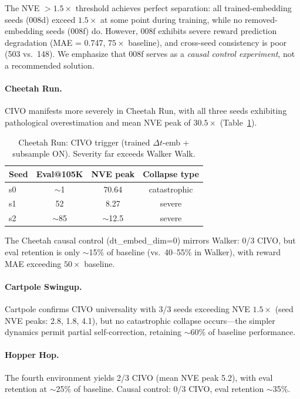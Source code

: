 \documentclass[10pt,letterpaper]{article}
\newcommand{\dt}{\Delta t}
\begin{document}
The NVE $> 1.5\times$ threshold achieves perfect separation: all trained-embedding seeds (008d) exceed $1.5\times$ at some point during training, while no removed-embedding seeds (008f) do. However, 008f exhibits severe reward prediction degradation (MAE = 0.747, $75\times$ baseline), and cross-seed consistency is poor (503 vs.\ 148). We emphasize that 008f serves as a \emph{causal control experiment}, not a recommended solution.

\paragraph{Cheetah Run.}
CIVO manifests more severely in Cheetah Run, with all three seeds exhibiting pathological overestimation and mean NVE peak of $30.5\times$ (Table~\ref{tab:cheetah_civo}).

\begin{table}[h]
\centering
\caption{Cheetah Run: CIVO trigger (trained $\dt$-emb + subsample ON). Severity far exceeds Walker Walk.}
\label{tab:cheetah_civo}
\begin{tabular}{lccc}
\toprule
\textbf{Seed} & \textbf{Eval@105K} & \textbf{NVE peak} & \textbf{Collapse type} \\
\midrule
s0 & $\sim$1   & 70.64 & catastrophic \\
s1 & 52  & 8.27  & severe \\
s2 & $\sim$85  & $\sim$12.5 & severe \\
\bottomrule
\end{tabular}
\end{table}

The Cheetah causal control (dt\_embed\_dim=0) mirrors Walker: 0/3 CIVO, but eval retention is only $\sim$15\% of baseline (vs.\ 40--55\% in Walker), with reward MAE exceeding $50\times$ baseline.

\paragraph{Cartpole Swingup.}
Cartpole confirms CIVO universality with 3/3 seeds exceeding NVE $1.5\times$ (seed NVE peaks: 2.8, 1.8, 4.1), but no catastrophic collapse occurs---the simpler dynamics permit partial self-correction, retaining $\sim$60\% of baseline performance.

\paragraph{Hopper Hop.}
The fourth environment yields 2/3 CIVO (mean NVE peak 5.2), with eval retention at $\sim$25\% of baseline. Causal control: 0/3 CIVO, eval retention $\sim$35\%.
\end{document}
